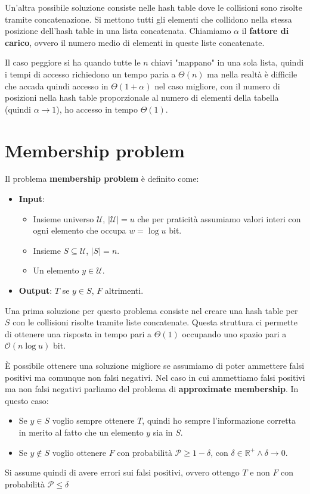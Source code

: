 Un'altra possibile soluzione consiste nelle hash table dove le collisioni sono
risolte tramite concatenazione. Si mettono tutti gli elementi che collidono nella
stessa posizione dell'hash table in una lista concatenata. Chiamiamo $\alpha$ il
\textbf{fattore di carico}, ovvero il numero medio di elementi in queste liste
concatenate.

Il caso peggiore si ha quando tutte le $n$ chiavi "mappano" in una sola lista,
quindi i tempi di accesso richiedono un tempo paria a $\Theta(n)$ ma nella realtà
è difficile che accada quindi accesso in $\Theta(1 + \alpha)$ nel caso migliore,
con il numero di posizioni nella hash table proporzionale al numero di elementi
della tabella (quindi $\alpha \to 1$), ho accesso in tempo $\Theta(1)$.
\section{Membership problem}
\begin{definizione}
    Il problema \textbf{membership problem} è definito come:
    \begin{itemize}
        \item \textbf{Input}:
              \begin{itemize}
                  \item Insieme universo $\mathcal{U}$, $|\mathcal{U}| = u$ che
                        per praticità assumiamo valori interi con ogni elemento
                        che occupa $w = \log u$ bit.
                  \item Insieme $S \subseteq \mathcal{U}$, $|S| = n$.
                  \item Un elemento $y \in \mathcal{U}$.
              \end{itemize}
        \item \textbf{Output}: $T$ se $y \in S$, $F$ altrimenti.
    \end{itemize}
\end{definizione}
Una prima soluzione per questo problema consiste nel creare una hash table per $S$
con le collisioni risolte tramite liste concatenate. Questa struttura ci permette
di ottenere una risposta in tempo pari a $\Theta(1)$ occupando uno spazio pari a
$\mathcal{O}(n \log u)$ bit.

È possibile ottenere una soluzione migliore se assumiamo di poter ammettere falsi
positivi ma comunque non falsi negativi. Nel caso in cui ammettiamo falsi positivi
ma non falsi negativi parliamo del problema di \textbf{approximate membership}.
In questo caso:
\begin{itemize}
    \item Se $y \in S$ voglio sempre ottenere $T$, quindi ho sempre l'informazione
          corretta in merito al fatto che un elemento $y$ sia in $S$.
    \item Se $y \notin S$ voglio ottenere $F$ con probabilità $\mathcal{P} \geq
              1 - \delta$, con $\delta \in \mathbb{R}^{+} \land \delta \to 0$.
\end{itemize}
Si assume quindi di avere errori sui falsi positivi, ovvero ottengo $T$ e non $F$
con probabilità $\mathcal{P} \leq \delta$

